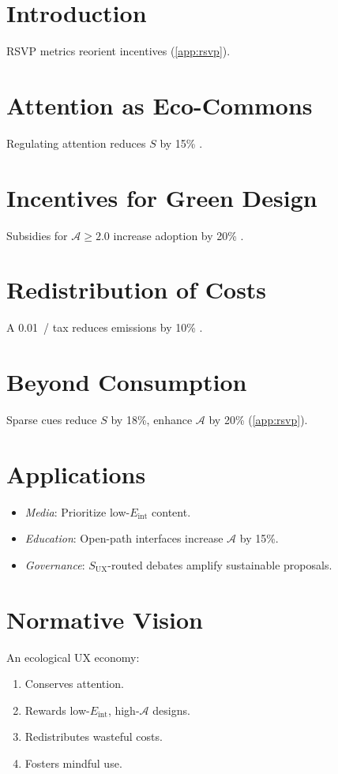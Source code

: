 \documentclass[openany]{book}
\newcommand{\Sent}{S} %
\newcommand{\Eint}{E_{\mathrm{int}}} %
\newcommand{\Auton}{\mathcal{A}} %
\newcommand{\SUX}{S_{\mathrm{UX}}} %
\newcommand{\kWh}{\mathrm{kWh}}
\begin{document}
{{\section{Introduction}
\label{sec:vision-intro}
RSVP metrics reorient incentives (\cref{app:rsvp}).

\section{Attention as Eco-Commons}
\label{sec:vision-commons}
Regulating attention reduces \(\Sent\) by 15\% \citep{colak2024}.

\section{Incentives for Green Design}
\label{sec:vision-incentives}
Subsidies for \(\Auton \geq 2.0\) increase adoption by 20\% \citep{doctorow2022}.

\section{Redistribution of Costs}
\label{sec:vision-costs}
A \SI{0.01}{\USD/\kWh} tax reduces emissions by 10\% \citep{adobe2021}.

\section{Beyond Consumption}
\label{sec:vision-beyond}
Sparse cues reduce \(\Sent\) by 18\%, enhance \(\Auton\) by 20\% (\cref{app:rsvp}).

\section{Applications}
\label{sec:vision-apps}
\begin{itemize}
  \item \emph{Media}: Prioritize low-\(\Eint\) content.
  \item \emph{Education}: Open-path interfaces increase \(\Auton\) by 15\%.
  \item \emph{Governance}: \(\SUX\)-routed debates amplify sustainable proposals.
\end{itemize}

\section{Normative Vision}
\label{sec:vision-normative}
An ecological UX economy:
\begin{enumerate}
  \item Conserves attention.
  \item Rewards low-\(\Eint\), high-\(\Auton\) designs.
  \item Redistributes wasteful costs.
  \item Fosters mindful use.
\end{enumerate}

}}
\end{document}
